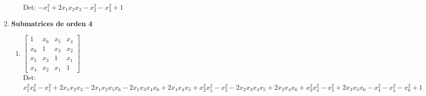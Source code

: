 \documentclass[12pt]{article}
\begin{document}
\begin{enumerate}
\begin{enumerate}
\begin{enumerate}
Det: $- x_{1}^{2} + 2 x_{1} x_{2} x_{3} - x_{2}^{2} - x_{3}^{2} + 1$\\

\end{enumerate}

\item {\bf Submatrices de orden 4}\\

\begin{enumerate}


\item $\displaystyle \left[\begin{matrix}1 & x_{6} & x_{5} & x_{4}\\x_{6} & 1 & x_{3} & x_{2}\\x_{5} & x_{3} & 1 & x_{1}\\x_{4} & x_{2} & x_{1} & 1\end{matrix}\right]$\\

Det: $x_{1}^{2} x_{6}^{2} - x_{1}^{2} + 2 x_{1} x_{2} x_{3} - 2 x_{1} x_{2} x_{5} x_{6} - 2 x_{1} x_{3} x_{4} x_{6} + 2 x_{1} x_{4} x_{5} + x_{2}^{2} x_{5}^{2} - x_{2}^{2} - 2 x_{2} x_{3} x_{4} x_{5} + 2 x_{2} x_{4} x_{6} + x_{3}^{2} x_{4}^{2} - x_{3}^{2} + 2 x_{3} x_{5} x_{6} - x_{4}^{2} - x_{5}^{2} - x_{6}^{2} + 1$\\

\end{enumerate}

\end{enumerate}

\end{enumerate}
\end{document}

